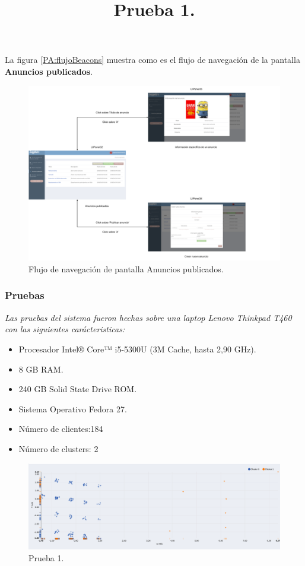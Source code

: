 La figura \ref{PA:flujoBeacons} muestra como es el flujo de navegación de la pantalla \textbf{Anuncios publicados}.

\FloatBarrier
\begin{figure}[htbp!]
		\centering
			\includegraphics[width=1 \textwidth]{imagenes/paneladminmapa/anuncios3}
		\caption{Flujo de navegación de pantalla Anuncios publicados.}
		\label{PA:flujoAnuncios}
\end{figure}
\FloatBarrier

\subsubsection{Pruebas}

\textit{Las pruebas del sistema fueron hechas sobre una laptop Lenovo Thinkpad T460 con las siguientes carácteristicas:\\}
\begin{itemize}
\item Procesador Intel® Core™ i5-5300U (3M Cache, hasta 2,90 GHz).
\item 8 GB RAM.
\item 240 GB Solid State Drive ROM.
\item Sistema Operativo Fedora 27.
\end{itemize}
\title{\textbf{Prueba 1.}}

\begin{itemize}
\item Número de clientes:184
\item Número de clusters: 2
\end{itemize}

\FloatBarrier
\begin{figure}[htbp!]
		\centering
			\includegraphics[width=1 \textwidth]{imagenes/pruebassistemarecom/cluster2_1}
		\caption{Prueba 1.}
\end{figure}
\FloatBarrier


